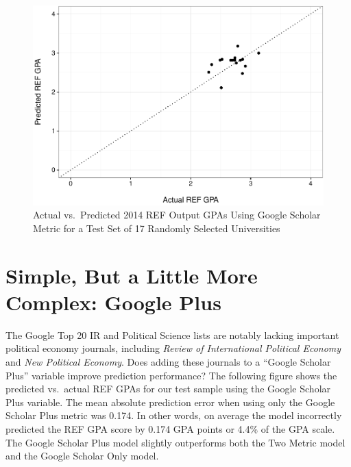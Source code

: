 \documentclass[]{article}
\begin{document}
\begin{figure}[htbp]
\centering
\includegraphics{README_files/figure-latex/unnamed-chunk-3-1.pdf}
\caption{Actual vs.~Predicted 2014 REF Output GPAs Using Google Scholar
Metric for a Test Set of 17 Randomly Selected Universities}
\end{figure}

\section{Simple, But a Little More Complex: Google
Plus}\label{simple-but-a-little-more-complex-google-plus}

The Google Top 20 IR and Political Science lists are notably lacking
important political economy journals, including \emph{Review of
International Political Economy} and \emph{New Political Economy}. Does
adding these journals to a ``Google Scholar Plus'' variable improve
prediction performance? The following figure shows the predicted
vs.~actual REF GPAs for our test sample using the Google Scholar Plus
variable. The mean absolute prediction error when using only the Google
Scholar Plus metric was 0.174. In other words, on average the model
incorrectly predicted the REF GPA score by 0.174 GPA points or 4.4\% of
the GPA scale. The Google Scholar Plus model slightly outperforms both
the Two Metric model and the Google Scholar Only model.
\end{document}
